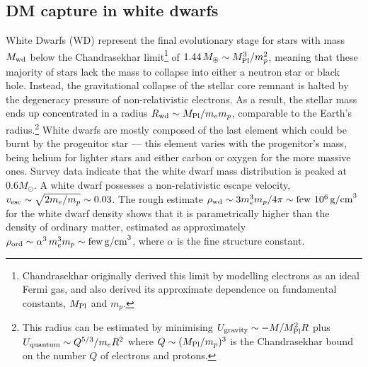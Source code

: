 \subsection{DM capture in white dwarfs}\label{sec:CaptureWD}
White Dwarfs (WD) 
represent the final evolutionary stage for stars with mass $M_{\rm wd}$ below the Chandrasekhar limit\footnote{
Chandrasekhar originally derived this limit by modelling electrons as an ideal Fermi gas, and also derived its approximate dependence on fundamental constants, $M_{\rm Pl}$ and $m_p$.
} of
$1.44 \, M_\circledast \sim M_{\rm Pl}^3/m_p^2$, 
meaning that these majority of stars lack the mass to collapse into either a neutron star or black hole.
Instead, the gravitational collapse of the stellar core remnant is halted by the degeneracy pressure of non-relativistic electrons.
As a result, the stellar mass ends up concentrated in a radius $R_{\rm wd} \sim M_{\rm Pl}/m_e m_p$, comparable to the Earth's radius.\footnote{This radius
can be estimated by minimising $U_{\rm gravity} \sim -M/M_{\rm Pl}^2 R$ plus $U_{\rm quantum} \sim Q^{5/3}/m_eR^2$ where
$Q \sim (M_{\rm Pl}/m_p)^3$ is the Chandrasekhar bound on the number $Q$ of electrons and protons.}
White dwarfs are mostly composed of the last element which could be burnt by the progenitor star --- this element varies with the progenitor's mass, being helium for lighter stars and either carbon or oxygen for the more massive ones. 
Survey data indicate that the white dwarf mass distribution is peaked at $ 0.6 M_\odot$.
A white dwarf possesses a non-relativistic escape velocity, $v_{\rm esc} \sim \sqrt{2 m_e/m_p} \sim 0.03$.
The rough estimate $\rho_{\rm wd} \sim 3m_e^3 m_p/4\pi  \sim {\rm few} \ 10^{6}\,{\rm g/cm}^3$ for the white dwarf density shows that it is
parametrically higher than the density of ordinary matter, 
estimated as approximately
$\rho_{\rm ord}\sim \alpha^3 \, m_e^3 m_p\sim {\rm few} \,{\rm g/cm}^3$,  where $\alpha$ is the fine structure constant.

\smallskip



